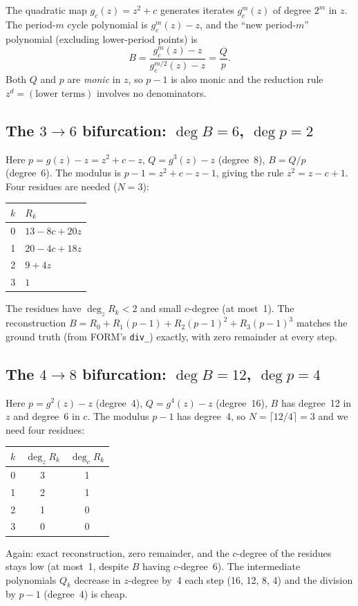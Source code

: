 \documentclass[11pt]{article}
\begin{document}
The quadratic map $g_c(z)=z^2+c$ generates iterates $g_c^m(z)$ of degree
$2^m$ in $z$.  The period-$m$ cycle polynomial is $g_c^m(z)-z$, and the
``new period-$m$'' polynomial (excluding lower-period points) is
\[
B = \frac{g_c^m(z)-z}{g_c^{m/2}(z)-z} = \frac{Q}{p}.
\]
Both $Q$ and $p$ are \emph{monic} in $z$, so $p-1$ is also monic and the
reduction rule $z^d=(\text{lower terms})$ involves no denominators.

\subsection{The $3\to6$ bifurcation: $\deg B=6$, $\deg p=2$}

Here $p=g(z)-z=z^2+c-z$, $Q=g^3(z)-z$ (degree~8), $B=Q/p$ (degree~6).
The modulus is $p-1=z^2+c-z-1$, giving the rule $z^2=z-c+1$.  Four
residues are needed ($N=3$):
\begin{center}
\renewcommand{\arraystretch}{1.2}
\begin{tabular}{cl}
$k$ & $R_k$ \\\hline
0 & $13-8c+20z$ \\
1 & $20-4c+18z$ \\
2 & $9+4z$ \\
3 & $1$
\end{tabular}
\end{center}
The residues have $\deg_z R_k<2$ and small $c$-degree (at most~1).  The
reconstruction $B=R_0+R_1(p{-}1)+R_2(p{-}1)^2+R_3(p{-}1)^3$ matches the
ground truth (from FORM's \texttt{div\_}) exactly, with zero remainder at
every step.

\subsection{The $4\to8$ bifurcation: $\deg B=12$, $\deg p=4$}

Here $p=g^2(z)-z$ (degree~4), $Q=g^4(z)-z$ (degree~16), $B$ has degree~12
in $z$ and degree~6 in $c$.  The modulus $p-1$ has degree~4, so
$N=\lceil12/4\rceil=3$ and we need four residues:
\begin{center}
\renewcommand{\arraystretch}{1.2}
\begin{tabular}{ccc}
$k$ & $\deg_z R_k$ & $\deg_c R_k$ \\\hline
0 & 3 & 1 \\
1 & 2 & 1 \\
2 & 1 & 0 \\
3 & 0 & 0
\end{tabular}
\end{center}
Again: exact reconstruction, zero remainder, and the $c$-degree of the
residues stays low (at most~1, despite $B$ having $c$-degree~6).  The
intermediate polynomials $Q_k$ decrease in $z$-degree by~4 each step
(16, 12, 8, 4) and the division by $p-1$ (degree~4) is cheap.
\end{document}
